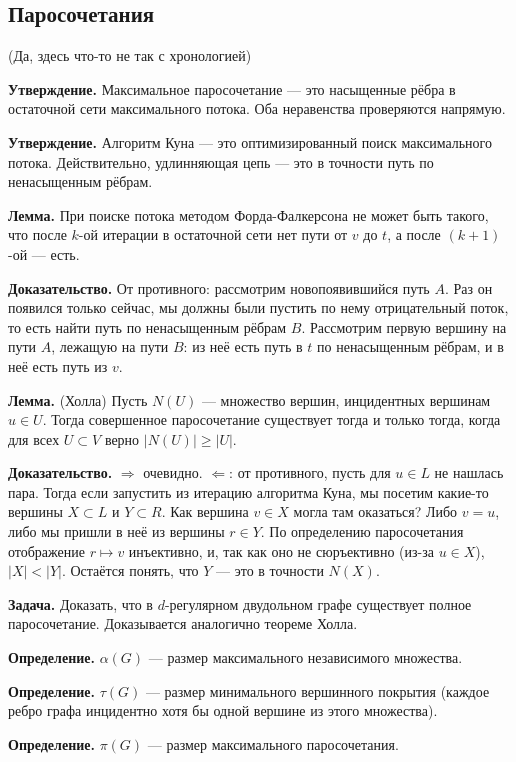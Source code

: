 \subsection{Паросочетания}
(Да, здесь что-то не так с хронологией)

\textbf{Утверждение.} Максимальное паросочетание --- это насыщенные рёбра в остаточной сети максимального потока. Оба неравенства проверяются напрямую.

\textbf{Утверждение.} Алгоритм Куна --- это оптимизированный поиск максимального потока.
Действительно, удлинняющая цепь --- это в точности путь по ненасыщенным рёбрам.

\textbf{Лемма.} При поиске потока методом Форда-Фалкерсона не может быть такого, что после $k$-ой итерации в остаточной сети нет пути от $v$ до $t$, а после $(k+1)$-ой --- есть.

\textbf{Доказательство.} От противного: рассмотрим новопоявившийся путь $A$.
Раз он появился только сейчас, мы должны были пустить по нему отрицательный поток, то есть найти путь по ненасыщенным рёбрам $B$.
Рассмотрим первую вершину на пути $A$, лежащую на пути $B$: из неё есть путь в $t$ по ненасыщенным рёбрам, и в неё есть путь из $v$.

\textbf{Лемма.} (Холла) Пусть $N(U)$ --- множество вершин, инцидентных вершинам $u \in U$.
Тогда совершенное паросочетание существует тогда и только тогда, когда для всех $U \subset V$ верно $|N(U)| \ge |U|$.

\textbf{Доказательство.} $\Rightarrow$ очевидно. $\Leftarrow$: от противного, пусть для $u \in L$ не нашлась пара.
Тогда если запустить из итерацию алгоритма Куна, мы посетим какие-то вершины $X \subset L$ и $Y \subset R$.
Как вершина $v \in X$ могла там оказаться? Либо $v = u$, либо мы пришли в неё из вершины $r \in Y$.
По определению паросочетания отображение $r \mapsto v$ инъективно, и, так как оно не сюръективно (из-за $u \in X$), $|X| < |Y|$.
Остаётся понять, что $Y$ --- это в точности $N(X)$.

\textbf{Задача.} Доказать, что в $d$-регулярном двудольном графе существует полное паросочетание.
Доказывается аналогично теореме Холла.

\textbf{Определение.} $\alpha(G)$ --- размер максимального независимого множества.

\textbf{Определение.} $\tau(G)$ --- размер минимального вершинного покрытия (каждое ребро графа инцидентно хотя бы одной вершине из этого множества).

\textbf{Определение.} $\pi(G)$ --- размер максимального паросочетания.

